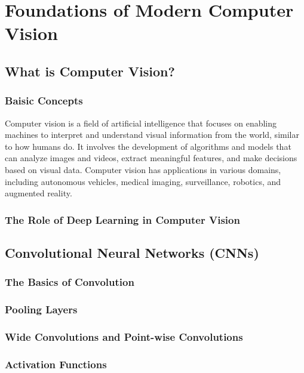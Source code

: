 \part{Foundations of Modern Computer Vision}

\chapter{What is Computer Vision?}
\section{Baisic Concepts}
Computer vision is a field of artificial intelligence that focuses on enabling machines to interpret and understand visual information from the world, similar to how humans do. It involves the development of algorithms and models that can analyze images and videos, extract meaningful features, and make decisions based on visual data. Computer vision has applications in various domains, including autonomous vehicles, medical imaging, surveillance, robotics, and augmented reality.
\section{The Role of Deep Learning in Computer Vision}

\chapter{Convolutional Neural Networks (CNNs)}
\section{The Basics of Convolution}
\section{Pooling Layers}
\section{Wide Convolutions and Point-wise Convolutions}
\section{Activation Functions}

